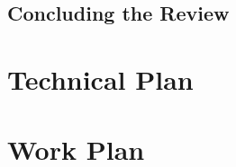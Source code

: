 \documentclass[a4paper, 12pt]{extreport}
\begin{document}
		
		\section{Concluding the Review}
	
	\chapter{Technical Plan}
	
		
	
	\chapter{Work Plan}
		
	
	\printbibliography[heading={bibnumbered}, title={References}]
		
\end{document}
